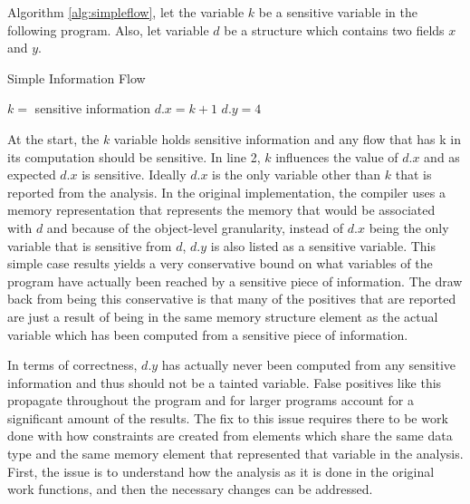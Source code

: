 \documentclass[11pt,a4paper]{article}
\begin{document}
  Algorithm \ref{alg:simpleflow}, let the variable $k$ be a sensitive variable in the following program. Also, let
  variable $d$ be a structure which contains two fields $x$ and $y$. 

  \begin{algorithm}
    \caption{Simple Information Flow}
    \label{alg:simpleflow}
  \begin{algorithmic}
    \State $k =$ sensitive information
    \State $d.x =  k + 1$
    \State $d.y = 4$
  \end{algorithmic}
  \end{algorithm}

  \begin{algorithm}

  \end{algorithm}

  At the start, the $k$ variable holds sensitive information and any flow that has k
  in its computation should be sensitive. In line 2, $k$ influences the value of $d.x$
  and as expected $d.x$ is sensitive. Ideally $d.x$ is the only variable other
  than $k$ that is reported from the analysis. In the original implementation,
  the compiler uses a memory representation that represents the memory that would
  be associated with $d$ and because of the object-level granularity, instead of
  $d.x$ being the only variable that is sensitive from $d$, $d.y$ is also listed
  as a sensitive variable. This simple case results yields a very conservative
  bound on what variables of the program have actually been reached by a sensitive
  piece of information. The draw back from being this conservative is that many of
  the positives that are reported are just a result of being in the same memory
  structure element as the actual variable which has been computed from a
  sensitive piece of information.

  In terms of correctness, $d.y$ has actually never been computed from any
  sensitive information and thus should not be a tainted variable. False
  positives like this propagate throughout the program and for larger programs
  account for a significant amount of the results. The fix to this issue
  requires there to be work done with how constraints are created from elements
  which share the same data type and the same memory element that represented
  that variable in the analysis. First, the issue is to understand how the
  analysis as it is done in the original work functions, and then the necessary
  changes can be addressed.
\end{document}
